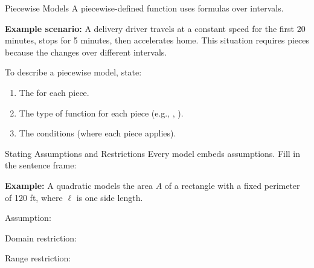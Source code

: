 \documentclass[10pt]{article}
\begin{document}
\vspace{0.06in}

\begin{notesbox}{Piecewise Models}
A piecewise-defined function uses \blank{3cm} formulas over \blank{3cm} intervals.

\medskip
\textbf{Example scenario:} A delivery driver travels at a constant speed for the first
20 minutes, stops for 5 minutes, then accelerates home. This situation requires
\blank{1.5cm} pieces because the \blank{4cm} changes over different intervals.

\medskip
To describe a piecewise model, state:
\begin{enumerate}[itemsep=3pt]
  \item The \blank{2.5cm} for each piece.
  \item The type of function for each piece (e.g., \blank{2cm}, \blank{2cm}).
  \item The \blank{3cm} conditions (where each piece applies).
\end{enumerate}
\end{notesbox}

\vspace{0.06in}

\begin{notesbox}{Stating Assumptions and Restrictions}
Every model embeds assumptions. Fill in the sentence frame:

\medskip
\begin{center}
\end{center}

\medskip
\textbf{Example:} A quadratic models the area $A$ of a rectangle with a fixed perimeter of
120 ft, where $\ell$ is one side length.

\medskip
Assumption: \writeline

Domain restriction: \writeline

Range restriction: \writeline
\end{notesbox}
\end{document}
